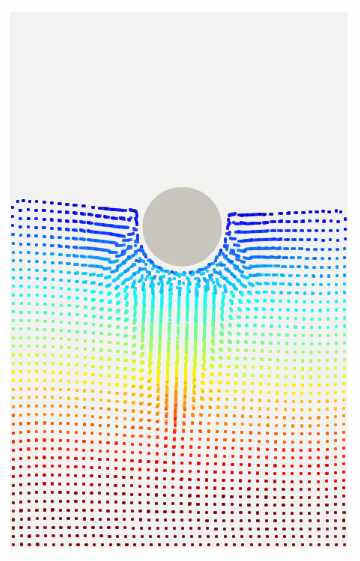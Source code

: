 \documentclass[final,3p,times]{elsarticle}
\begin{document}
\begin{figure}[H]
	\centering
	\begin{subfigure}{0.38\columnwidth}	
		\centering
		\includegraphics[width=1.0\textwidth]{Images/CD_SPH.png}
	\end{subfigure}
	\begin{subfigure}{0.38\columnwidth}
		\centering

\end{subfigure}
\end{figure}
\end{document}
